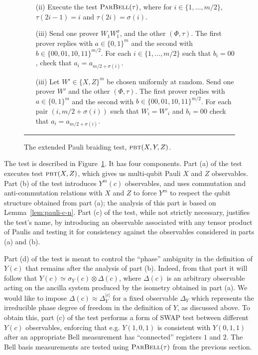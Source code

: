 \begin{figure}[H]
\begin{itemize}
\begin{enumerate}
\begin{enumerate}
\item[(ii)] Execute the test $\textsc{ParBell}(\tau)$, where for $i\in \{1,\ldots,m/2\}$, $\tau(2i-1)=i$ and $\tau(2i)=\sigma(i)$.
\item[(iii)] Send one prover $W_1  W_1^\sigma$, and the other $(\Phi,\tau)$. 
    The first prover replies with $a\in\{0, 1 \}^m$ and the second with $b\in \{00,01,10,11\}^{m/2}$. For each
    $i\in\{1,\ldots,m/2\}$ such that $b_i = 00$, check that $a_i  = a_{m/2+\sigma(i)}$. 
		\item[(iii)] Let $W'\in\{X,Z\}^m$ be chosen uniformly at random. Send one prover $W'$ and the other $(\Phi,\tau)$. The first prover replies  with $a\in\{0, 1 \}^m$ and the second with $b\in \{00,01,10,11\}^{m/2}$. For each pair $(i,m/2+\sigma(i))$ such that $W_i=W'_i$ and $b_i=00$ check that $a_i=a_{m/2+\sigma(i)}$. 
\end{enumerate}
\end{enumerate}
\end{itemize}
\rule[2ex]{\textwidth}{0.5pt}\vspace{-.5cm}
\caption{The extended Pauli braiding test, $\textsc{pbt}(X,Y,Z)$.}
\label{fig:e-pbt}
\end{figure}


The test is described in Figure~\ref{fig:e-pbt}. It has four components. Part (a) of the test executes test $\textsc{pbt}(X,Z)$, which gives us multi-qubit Pauli $X$ and $Z$ observables. 
Part (b) of the test introduces $Y^m(c)$ observables, and uses commutation and anti-commutation relations with $X$ and $Z$ to force $Y^m$ to respect the qubit structure obtained from part (a); the analysis of this part is based on Lemma~\ref{lem:pauli-c-n}. Part (c) of the test, while not strictly necessary, justifies the test's name, by introducing an observable associated with any tensor product of Paulis and testing it for consistency against the observables considered in parts (a) and (b). 

Part (d) of the test is meant to control the ``phase'' ambiguity in the definition of $Y(c)$ that remains after the analysis of part (b). Indeed, from that part it will follow that $Y(c) \simeq \sigma_Y(c) \otimes \Delta(c)$, where $\Delta(c)$ is an arbitrary observable acting on the ancilla system produced by the isometry obtained in part (a). We would like to impose $\Delta(c) \approx \Delta_Y^{|c|}$ for a fixed observable $\Delta_Y$ which  represents the irreducible phase degree of freedom in the definition of $Y$, as discussed above. To obtain this, part (c) of the test performs a form of SWAP test between different $Y(c)$ observables, enforcing that e.g. $Y(1,0,1)$ is consistent with $Y(0,1,1)$ after an appropriate Bell measurement has ``connected'' registers $1$ and $2$. The Bell basis measurements are tested using $\textsc{ParBell}(\tau)$ from the previous section. 

